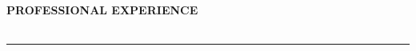 \begin{center}
\textbf{PROFESSIONAL EXPERIENCE}
\end{center}

\vspace{\sectionTitleSpacing}

\begin{longtable}{p{}p{}}




\end{longtable}

\vspace{\sectionSeparatorSpacing}
\rule{\textwidth}{}
\vspace{\sectionSeparatorSpacing} 